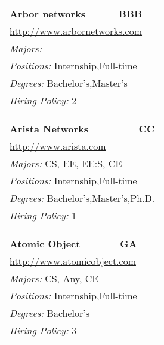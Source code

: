 \documentclass[twoside]{article}
\begin{document}
\begin{center}
\begin{multicols}{3}
\begin{FlushLeft}
\begin{minipage}{.9\columnwidth}
\end{minipage}
 
\begin{minipage}{.9\columnwidth}\begin{tabularx}{.95\columnwidth}{Xr}
                 {\Large\bf Arbor networks} & {\Large\bf BBB}\\
    \multicolumn{2}{p{.95\columnwidth}}{\url{http://www.arbornetworks.com}}\\
    \multicolumn{2}{p{.95\columnwidth}}{\emph{Majors:} }\\
    \multicolumn{2}{p{.95\columnwidth}}{\emph{Positions:} Internship,Full-time}\\
    \multicolumn{2}{p{.95\columnwidth}}{\emph{Degrees:} Bachelor's,Master's}\\
    \multicolumn{2}{p{.95\columnwidth}}{\emph{Hiring Policy:} 2}\\
    \end{tabularx}
    
\end{minipage}
 
\begin{minipage}{.9\columnwidth}\begin{tabularx}{.95\columnwidth}{Xr}
                 {\Large\bf Arista Networks} & {\Large\bf CC}\\
    \multicolumn{2}{p{.95\columnwidth}}{\url{http://www.arista.com}}\\
    \multicolumn{2}{p{.95\columnwidth}}{\emph{Majors:} CS, EE, EE:S, CE}\\
    \multicolumn{2}{p{.95\columnwidth}}{\emph{Positions:} Internship,Full-time}\\
    \multicolumn{2}{p{.95\columnwidth}}{\emph{Degrees:} Bachelor's,Master's,Ph.D.}\\
    \multicolumn{2}{p{.95\columnwidth}}{\emph{Hiring Policy:} 1}\\
    \end{tabularx}
    
\end{minipage}
 
\begin{minipage}{.9\columnwidth}\begin{tabularx}{.95\columnwidth}{Xr}
                 {\Large\bf Atomic Object} & {\Large\bf GA}\\
    \multicolumn{2}{p{.95\columnwidth}}{\url{http://www.atomicobject.com}}\\
    \multicolumn{2}{p{.95\columnwidth}}{\emph{Majors:} CS, Any, CE}\\
    \multicolumn{2}{p{.95\columnwidth}}{\emph{Positions:} Internship,Full-time}\\
    \multicolumn{2}{p{.95\columnwidth}}{\emph{Degrees:} Bachelor's}\\
    \multicolumn{2}{p{.95\columnwidth}}{\emph{Hiring Policy:} 3}\\
    \end{tabularx}
    

\end{minipage}
\end{FlushLeft}
\end{multicols}
\end{center}
\end{document}
